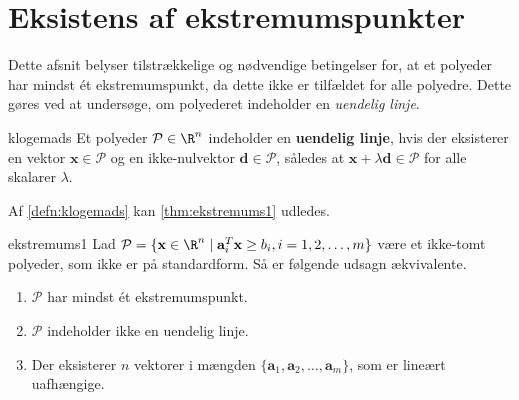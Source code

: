 \section{Eksistens af ekstremumspunkter}
%
Dette afsnit belyser tilstrækkelige og nødvendige betingelser for, at et polyeder har mindst ét ekstremumspunkt, da dette ikke er tilfældet for alle polyedre. 
Dette gøres ved at undersøge, om polyederet indeholder en \textit{uendelig linje}.
%
\begin{defn}{}{klogemads}
Et polyeder $\mathcal{P} \in \R^n$ indeholder en \textbf{uendelig linje}, hvis der eksisterer en vektor $\textbf{x} \in \mathcal{P}$ og en ikke-nulvektor $\textbf{d} \in \mathcal{P}$, således at $\textbf{x} + \lambda \textbf{d} \in \mathcal{P}$ for alle skalarer $\lambda$.
\end{defn}
\noindent
%
Af \ref{defn:klogemads} kan \ref{thm:ekstremums1} udledes.
%
\begin{thm}{}{ekstremums1}
Lad $\mathcal{P} = \{\textbf{x} \in \R^n \mid \textbf{a}_i^T\textbf{x} \geq b_i, i = 1,2,\ldots,m  \}$ være et ikke-tomt polyeder, som ikke er på standardform.
Så er følgende udsagn ækvivalente.
%
\begin{enumerate}[label = (\alph*)]
\item $\mathcal{P}$ har mindst ét ekstremumspunkt.
\item $\mathcal{P}$ indeholder ikke en uendelig linje.
\item Der eksisterer $n$ vektorer i mængden $\{\mathbf{a}_1, \mathbf{a}_2, \ldots , \mathbf{a}_m \}$, som er lineært uafhængige.
\end{enumerate}
\end{thm}
%
\newpage
%

